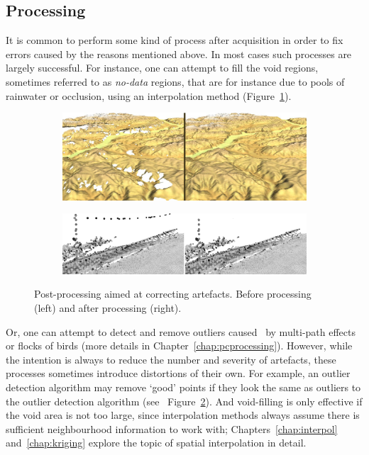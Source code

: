 \subsection{Processing}
It is common to perform some kind of process after acquisition in order to fix errors caused by the reasons mentioned above. 
In most cases such processes are largely successful. 
For instance, one can attempt to fill the void regions, sometimes referred to as \emph{no-data} regions, that are for instance due to pools of rainwater or occlusion, using an interpolation method (Figure~\ref{fig:voidfill}).
\begin{figure}
	\centering
	\begin{subfigure}{0.45\linewidth}
		\includegraphics[width=\textwidth]{figs/srtm_trento_voidfill.png}
		\label{fig:voidfill}
	\end{subfigure}
	\quad
	\begin{subfigure}{0.45\linewidth}
		\includegraphics[width=\textwidth]{figs/ourlier-detection-wrong.png}
		\label{fig:outlier-wrong}
	\end{subfigure}
	\caption{Post-processing aimed at correcting artefacts. Before processing (left) and after processing (right).}%
	\label{fig:processing}
\end{figure}
Or, one can attempt to detect and remove outliers caused \eg\ by multi-path effects or flocks of birds (more details in Chapter~\ref{chap:pcprocessing}). 
However, while the intention is always to reduce the number and severity of artefacts, these processes sometimes introduce distortions of their own.
For example, an outlier detection algorithm may remove `good' points if they look the same as outliers to the outlier detection algorithm (see \eg\ Figure~\ref{fig:outlier-wrong}).
And void-filling is only effective if the void area is not too large, since interpolation methods always assume there is sufficient neighbourhood information to work with; Chapters~\ref{chap:interpol} and~\ref{chap:kriging} explore the topic of spatial interpolation in detail.

